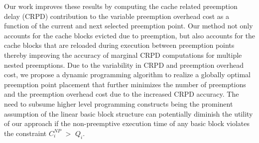 \newline
\indent
Our work improves these results by computing the cache related preemption delay (CRPD) contribution to the variable preemption overhead cost as a function of the current and next selected preemption point.  Our method not only accounts for the cache blocks evicted due to preemption, but also accounts for the cache blocks that are reloaded during execution between preemption points thereby improving the accuracy of marginal CRPD computations for multiple nested preemptions.
\newline
\indent
Due to the variability in CRPD and preemption overhead cost, we propose a dynamic programming algorithm to realize a globally optimal preemption point placement that further minimizes the number of preemptions and the preemption overhead cost due to the increased CRPD accuracy.  
The need to subsume higher level programming constructs being the prominent assumption of the linear basic block structure can potentially diminish the utility of our approach if the non-preemptive execution time of any basic block violates the constraint \begin{math}C_{i}^{NP}\end{math} \begin{math}>\end{math} \begin{math}Q_{i}\end{math}. 
